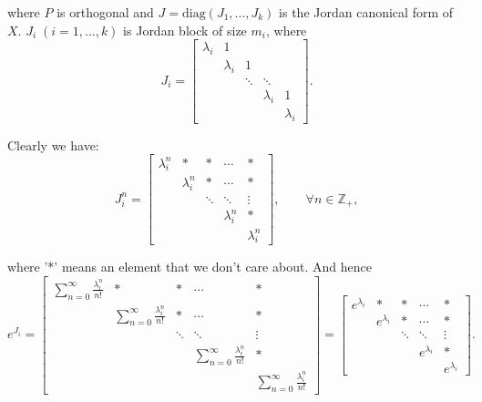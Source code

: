 \documentclass[twoside,a4paper]{article}
\begin{document}
where $P$ is orthogonal and $J=\text{diag}(J_1,...,J_k)$ is the Jordan canonical form of $X$. $J_i\;(i=1,...,k)$ is Jordan block of size $m_i$, where
\begin{equation*}
    J_i=\begin{bmatrix}
        \lambda_i & 1\\
        & \lambda_i & 1\\
        & & \ddots & \ddots\\
        & & & \lambda_i & 1\\
        & & & & \lambda_i
    \end{bmatrix}.
\end{equation*}

Clearly we have:
\begin{equation*}
    J_i^n = \begin{bmatrix}
        \lambda_i^n & * & * & \cdots & *\\
        & \lambda_i^n & * & \cdots & *\\
        & & \ddots & \ddots & \vdots\\
        & & & \lambda_i^n & *\\
        & & & & \lambda_i^n
    \end{bmatrix},\qquad \forall n\in\mathbb{Z}_+,
\end{equation*}

where '*' means an element that we don't care about. And hence
\begin{equation*}
    e^{J_i} = \begin{bmatrix}
        \sum_{n=0}^\infty \frac{\lambda_i^n}{n!} & * & * & \cdots & *\\
        & \sum_{n=0}^\infty \frac{\lambda_i^n}{n!} & * & \cdots & *\\
        & & \ddots & \ddots & \vdots\\
        & & & \sum_{n=0}^\infty \frac{\lambda_i^n}{n!} & *\\
        & & & & \sum_{n=0}^\infty \frac{\lambda_i^n}{n!}
    \end{bmatrix}=\begin{bmatrix}
        e^{\lambda_i} & * & * & \cdots & *\\
        & e^{\lambda_i} & * & \cdots & *\\
        & & \ddots & \ddots & \vdots\\
        & & & e^{\lambda_i} & *\\
        & & & & e^{\lambda_i}
    \end{bmatrix}.
\end{equation*}
\end{document}

